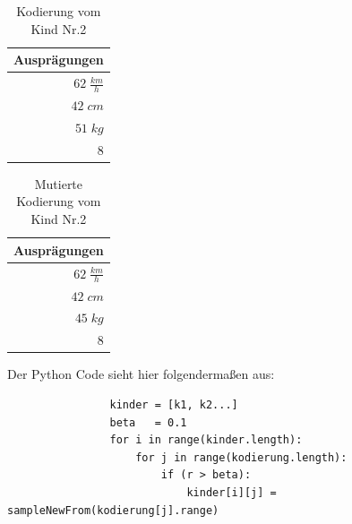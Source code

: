             \begin{multicols}{2}
                \begin{table}[H]
                    \begin{center}
                    \begin{tabular}{ |r| } 
                        \hline
                        \hfill Ausprägungen  \\ \hline
                        \cellcolor{yellow!25} $ 62\; \frac{km}{h}$ \\ \hline
                        \cellcolor{blue!25}   $ 42\; cm          $ \\ \hline
                        \cellcolor{blue!25}   $ 51\; kg          $ \\ \hline
                        \cellcolor{yellow!25} $  8               $ \\ \hline
                    \end{tabular}
                    \end{center}
                    \caption{Kodierung vom Kind Nr.2 \label{fig:somelabel}}
                \end{table}

                \begin{table}[H]
                    \begin{center}
                    \begin{tabular}{ |r| } 
                        \hline
                        \hfill Ausprägungen  \\ \hline
                        \cellcolor{yellow!25} $ 62\; \frac{km}{h}$ \\ \hline
                        \cellcolor{blue!25}   $ 42\; cm          $ \\ \hline
                        \cellcolor{red!25}    $ 45\; kg          $ \\ \hline
                        \cellcolor{yellow!25} $  8               $ \\ \hline
                    \end{tabular}
                    \end{center}
                    \caption{Mutierte Kodierung vom Kind Nr.2 \label{fig:somelabel}}
                \end{table}
            \end{multicols}
\newpage
            Der Python Code sieht hier folgendermaßen aus:
            \begin{verbatim}
                kinder = [k1, k2...]
                beta   = 0.1
                for i in range(kinder.length):
                    for j in range(kodierung.length):
                        if (r > beta):
                            kinder[i][j] = sampleNewFrom(kodierung[j].range)
            \end{verbatim}
